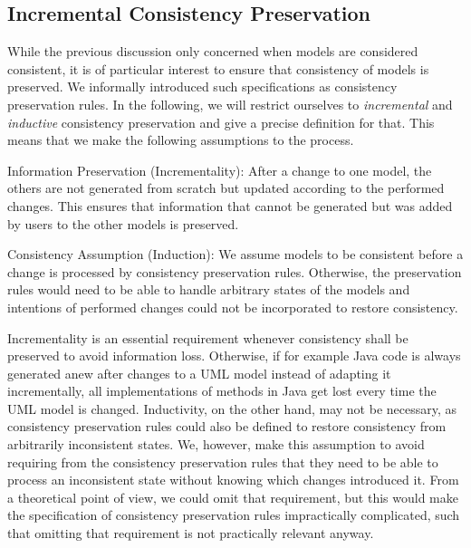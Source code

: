 \subsection{Incremental Consistency Preservation}
\label{chap:correctness:formalization:incremental_inductive}

While the previous discussion only concerned when models are considered consistent, it is of particular interest to ensure that consistency of models is preserved.
We informally introduced such specifications as consistency preservation rules.
In the following, we will restrict ourselves to \emph{incremental} and \emph{inductive} consistency preservation and give a precise definition for that.
This means that we make the following assumptions to the process.
\begin{properdescription}
    \item[Information Preservation (Incrementality):] After a change to one model, the others are not generated from scratch but updated according to the performed changes. This ensures that information that cannot be generated but was added by users to the other models is preserved.
    \item[Consistency Assumption (Induction):] We assume models to be consistent before a change is processed by consistency preservation rules. Otherwise, the preservation rules would need to be able to handle arbitrary states of the models and intentions of performed changes could not be incorporated to restore consistency.
\end{properdescription}
Incrementality is an essential requirement whenever consistency shall be preserved to avoid information loss. Otherwise, if for example Java code is always generated anew after changes to a \gls{UML} model instead of adapting it incrementally, all implementations of methods in Java get lost every time the \gls{UML} model is changed.
Inductivity, on the other hand, may not be necessary, as consistency preservation rules could also be defined to restore consistency from arbitrarily inconsistent states.
We, however, make this assumption to avoid requiring from the consistency preservation rules that they need to be able to process an inconsistent state without knowing which changes introduced it.
From a theoretical point of view, we could omit that requirement, but this would make the specification of consistency preservation rules impractically complicated, such that omitting that requirement is not practically relevant anyway.

